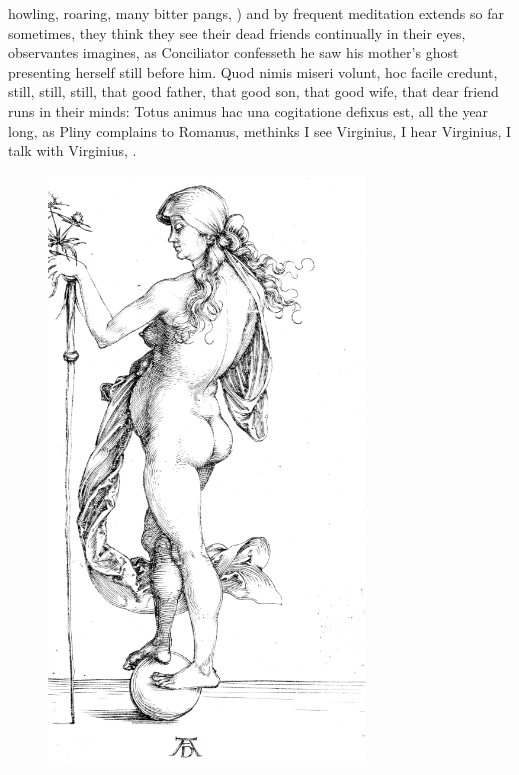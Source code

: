 {howling, roaring, many bitter pangs, ) and by frequent meditation extends so
far sometimes, they think they see their dead friends continually
in their eyes, observantes imagines, as Conciliator confesseth he saw
his mother's ghost presenting herself still before him. Quod nimis
miseri volunt, hoc facile credunt, still, still, still, that good
father, that good son, that good wife, that dear friend runs in their
minds: Totus animus hac una cogitatione defixus est, all the year long,
as Pliny complains to Romanus, methinks I see Virginius, I hear
Virginius, I talk with Virginius, \etc{}.

\begin{figure}[p]
  \begingroup
  \centering
  \includegraphics[keepaspectratio,width=0.75\textwidth]{figures/fortuna-small.jpg}
  \label{fig:fortuna}
\end{figure}

}
